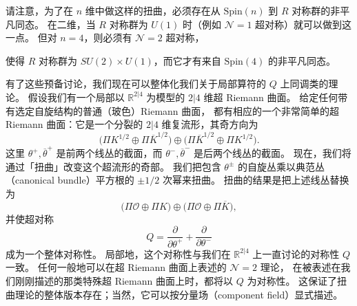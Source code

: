 请注意，为了在 $n$ 维中做这样的扭曲，必须存在从 $\mathrm{Spin}(n)$ 到 $R$ 对称群的非平凡同态。
在二维，当 $R$ 对称群为 $U(1)$ 时（例如 $\mathcal{N}=1$ 超对称）就可以做到这一点。
但对 $n=4$，则必须有 $\mathcal{N}=2$ 超对称，



使得 $R$ 对称群为 $SU(2)\times U(1)$，而它才有来自 $\mathrm{Spin}(4)$ 的非平凡同态。

有了这些预备讨论，我们现在可以整体化我们关于局部算符的 $Q$ 上同调类的理论。
假设我们有一个局部以 $\mathbb{R}^{2|4}$ 为模型的 $2|4$ 维超 Riemann 曲面。
给定任何带有选定自旋结构的普通（玻色）Riemann 曲面，
都有相应的一个非常简单的超 Riemann 曲面：它是一个分裂的 $2|4$ 维复流形，其奇方向为
\[
\bigl(\Pi K^{1/2}\oplus\Pi\overline{K}^{1/2}\bigr)\oplus
\bigl(\Pi\overline{K}^{1/2}\oplus\Pi K^{1/2}\bigr).
\]
这里 $\theta^+,\overline{\theta}^+$ 是前两个线丛的截面，而 $\theta^-,\overline{\theta}^-$ 是后两个线丛的截面。
现在，我们将通过「扭曲」改变这个超流形的奇部。
我们把包含 $\theta^\pm$ 的自旋丛乘以典范丛（canonical bundle）平方根的 $\pm1/2$ 次幂来扭曲。
扭曲的结果是把上述线丛替换为
\[
\bigl(\Pi\mathcal{O}\oplus\Pi K\bigr)\oplus\bigl(\Pi\mathcal{O}\oplus\Pi\overline{K}\bigr),
\]
并使超对称
\[
Q=\frac{\partial}{\partial\theta^+}+\frac{\partial}{\partial\theta^-}
\]
成为一个整体对称性。
局部地，这个对称性与我们在 $\mathbb{R}^{2|4}$ 上一直讨论的对称性 $Q$ 一致。
任何一般地可以在超 Riemann 曲面上表述的 $\mathcal{N}=2$ 理论，
在被表述在我们刚刚描述的那类特殊超 Riemann 曲面上时，都将以 $Q$ 为对称性。
这保证了扭曲理论的整体版本存在；当然，它可以按分量场（component field）显式描述。

